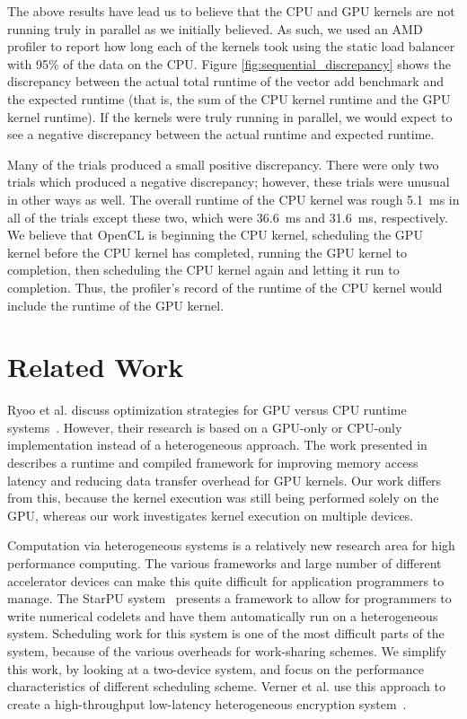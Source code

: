 \documentclass[journal]{IEEEtran}
\begin{document}
The above results have lead us to believe that the CPU and GPU kernels are
not running truly in parallel as we initially believed.  As such, we used
an AMD profiler to report how long each of the kernels took using the static
load balancer with 95\% of the data on the CPU.  Figure \ref{fig:sequential_discrepancy}
shows the discrepancy between the actual total runtime of the vector add
benchmark and the expected runtime (that is, the sum of the CPU kernel runtime
and the GPU kernel runtime).  If the kernels were truly running in parallel,
we would expect to see a negative discrepancy between the actual runtime and
expected runtime.

Many of the trials produced a small positive discrepancy.  There were only
two trials which produced a negative discrepancy; however, these trials
were unusual in other ways as well.  The overall runtime of the CPU kernel
was rough 5.1~ms in all of the trials except these two, which were 36.6~ms
and 31.6~ms, respectively.  We believe that OpenCL is beginning the CPU
kernel, scheduling the GPU kernel before the CPU kernel has completed,
running the GPU kernel to completion, then scheduling the CPU kernel again
and letting it run to completion.  Thus, the profiler's record of the runtime
of the CPU kernel would include the runtime of the GPU kernel.

\section{Related Work}
Ryoo et al. discuss optimization strategies for GPU versus CPU runtime
systems~\cite{Ryoo2007}.  However, their research is based on a GPU-only
or CPU-only implementation instead of a heterogeneous approach.  The work
presented in ~\cite{Jablin2011} describes a runtime and compiled framework
for improving memory access latency and reducing data transfer overhead
for GPU kernels.  Our work differs from this, because the kernel execution
was still being performed solely on the GPU, whereas our work investigates
kernel execution on multiple devices.

Computation via heterogeneous systems is a relatively new research area for
high performance computing.  The various frameworks and large number of
different accelerator devices can make this quite difficult for application
programmers to manage.  The StarPU system~\cite{Augonnet2009} presents a 
framework to allow for programmers to write numerical codelets and have them
automatically run on a heterogeneous system.  Scheduling work for this system
is one of the most difficult parts of the system, because of the various
overheads for work-sharing schemes. We simplify this work, by looking at a
two-device system, and focus on the performance characteristics of different
scheduling scheme.  Verner et al. use this approach to create a high-throughput
low-latency heterogeneous encryption system~\cite{Verner2011}. 
\end{document}
